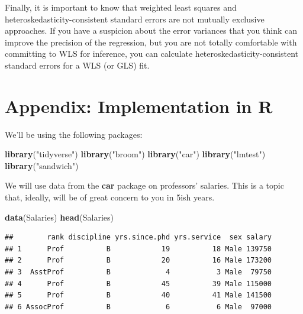 \documentclass[
  12pt,
  oneside,openany]{book}
\newenvironment{Shaded}{\begin{snugshade}}{\end{snugshade}}
\newcommand{\KeywordTok}[1]{\textcolor[rgb]{0.13,0.29,0.53}{\textbf{#1}}}
\newcommand{\NormalTok}[1]{#1}
\newcommand{\StringTok}[1]{\textcolor[rgb]{0.31,0.60,0.02}{#1}}
\begin{document}
Finally, it is important to know that weighted least squares and heteroskedasticity-consistent standard errors are not mutually exclusive approaches. If you have a suspicion about the error variances that you think can improve the precision of the regression, but you are not totally comfortable with committing to WLS for inference, you can calculate heteroskedasticity-consistent standard errors for a WLS (or GLS) fit.

\hypertarget{appendix-implementation-in-r}{%
\section{Appendix: Implementation in R}\label{appendix-implementation-in-r}}

We'll be using the following packages:

\begin{Shaded}
\begin{Highlighting}[]
\KeywordTok{library}\NormalTok{(}\StringTok{"tidyverse"}\NormalTok{)}
\KeywordTok{library}\NormalTok{(}\StringTok{"broom"}\NormalTok{)}
\KeywordTok{library}\NormalTok{(}\StringTok{"car"}\NormalTok{)}
\KeywordTok{library}\NormalTok{(}\StringTok{"lmtest"}\NormalTok{)}
\KeywordTok{library}\NormalTok{(}\StringTok{"sandwich"}\NormalTok{)}
\end{Highlighting}
\end{Shaded}

We will use data from the \textbf{car} package on professors' salaries. This is a topic that, ideally, will be of great concern to you in 5ish years.

\begin{Shaded}
\begin{Highlighting}[]
\KeywordTok{data}\NormalTok{(Salaries)}
\KeywordTok{head}\NormalTok{(Salaries)}
\end{Highlighting}
\end{Shaded}

\begin{verbatim}
##        rank discipline yrs.since.phd yrs.service  sex salary
## 1      Prof          B            19          18 Male 139750
## 2      Prof          B            20          16 Male 173200
## 3  AsstProf          B             4           3 Male  79750
## 4      Prof          B            45          39 Male 115000
## 5      Prof          B            40          41 Male 141500
## 6 AssocProf          B             6           6 Male  97000
\end{verbatim}
\end{document}
